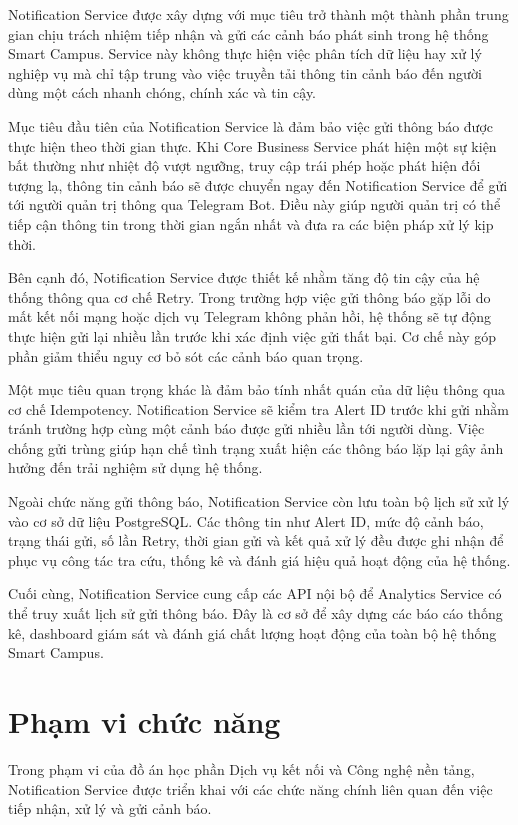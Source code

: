 Notification Service được xây dựng với mục tiêu trở thành một thành phần trung gian chịu trách nhiệm tiếp nhận và gửi các cảnh báo phát sinh trong hệ thống Smart Campus. Service này không thực hiện việc phân tích dữ liệu hay xử lý nghiệp vụ mà chỉ tập trung vào việc truyền tải thông tin cảnh báo đến người dùng một cách nhanh chóng, chính xác và tin cậy.

Mục tiêu đầu tiên của Notification Service là đảm bảo việc gửi thông báo được thực hiện theo thời gian thực. Khi Core Business Service phát hiện một sự kiện bất thường như nhiệt độ vượt ngưỡng, truy cập trái phép hoặc phát hiện đối tượng lạ, thông tin cảnh báo sẽ được chuyển ngay đến Notification Service để gửi tới người quản trị thông qua Telegram Bot. Điều này giúp người quản trị có thể tiếp cận thông tin trong thời gian ngắn nhất và đưa ra các biện pháp xử lý kịp thời.

Bên cạnh đó, Notification Service được thiết kế nhằm tăng độ tin cậy của hệ thống thông qua cơ chế Retry. Trong trường hợp việc gửi thông báo gặp lỗi do mất kết nối mạng hoặc dịch vụ Telegram không phản hồi, hệ thống sẽ tự động thực hiện gửi lại nhiều lần trước khi xác định việc gửi thất bại. Cơ chế này góp phần giảm thiểu nguy cơ bỏ sót các cảnh báo quan trọng.

Một mục tiêu quan trọng khác là đảm bảo tính nhất quán của dữ liệu thông qua cơ chế Idempotency. Notification Service sẽ kiểm tra Alert ID trước khi gửi nhằm tránh trường hợp cùng một cảnh báo được gửi nhiều lần tới người dùng. Việc chống gửi trùng giúp hạn chế tình trạng xuất hiện các thông báo lặp lại gây ảnh hưởng đến trải nghiệm sử dụng hệ thống.

Ngoài chức năng gửi thông báo, Notification Service còn lưu toàn bộ lịch sử xử lý vào cơ sở dữ liệu PostgreSQL. Các thông tin như Alert ID, mức độ cảnh báo, trạng thái gửi, số lần Retry, thời gian gửi và kết quả xử lý đều được ghi nhận để phục vụ công tác tra cứu, thống kê và đánh giá hiệu quả hoạt động của hệ thống.

Cuối cùng, Notification Service cung cấp các API nội bộ để Analytics Service có thể truy xuất lịch sử gửi thông báo. Đây là cơ sở để xây dựng các báo cáo thống kê, dashboard giám sát và đánh giá chất lượng hoạt động của toàn bộ hệ thống Smart Campus.


\section{Phạm vi chức năng}

Trong phạm vi của đồ án học phần Dịch vụ kết nối và Công nghệ nền tảng, Notification Service được triển khai với các chức năng chính liên quan đến việc tiếp nhận, xử lý và gửi cảnh báo.

